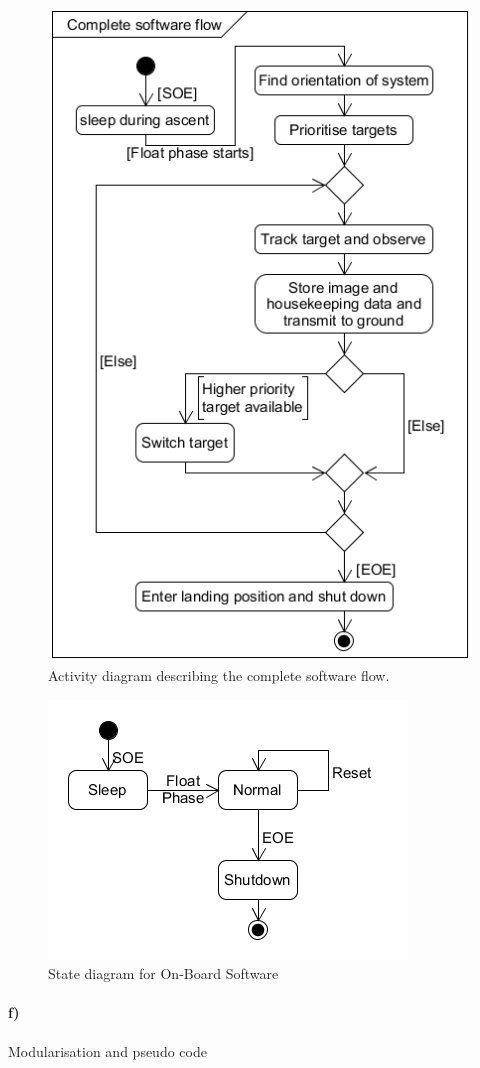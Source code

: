 \begin{figure}[H]
    \centering
    \includegraphics[width=.5\textwidth]{4-experiment-design/img/software/activity-diagram.png}
    \caption{Activity diagram describing the complete software flow.}
    \label{fig:software-activity-diagram}
\end{figure}

\begin{figure}[H]
	\centering
	\includegraphics[width=.55\textwidth]{4-experiment-design/img/software/state-diagram.png}
	\caption{State diagram for On-Board Software}
	\label{fig:software-state-diagram}
\end{figure}

\paragraph{f)} Modularisation and pseudo code\\

